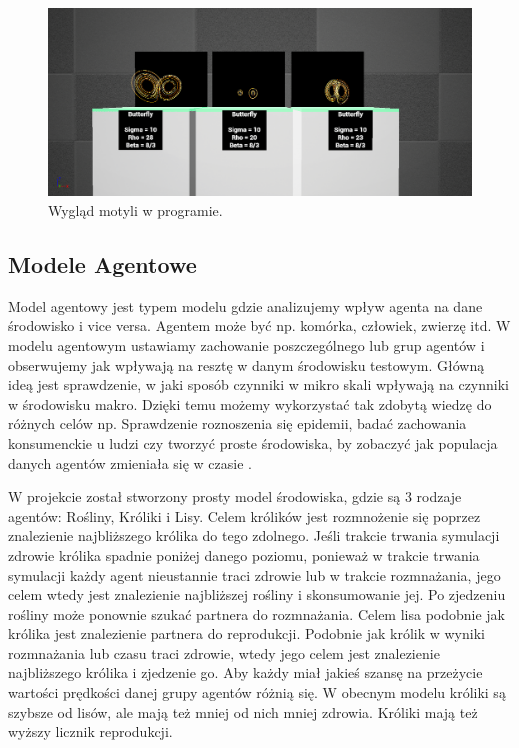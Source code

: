 \documentclass[a4paper,12pt,reqno]{article}
\begin{document}
\begin{figure}[H]%
\centering
\includegraphics[width=0.9\columnwidth]{graphics/butterfly/ButterflyInUE_1.png}
\caption{Wygląd motyli w programie.
\label{ButterflyEffectUE4}}%
%
\qquad
\end{figure}  

\newpage
\subsection{Modele Agentowe}

Model agentowy jest typem modelu gdzie analizujemy wpływ agenta na dane środowisko i vice versa. Agentem może być np. komórka, człowiek, zwierzę itd. W modelu agentowym ustawiamy zachowanie poszczególnego lub grup agentów i obserwujemy jak wpływają na resztę w danym środowisku testowym. Główną ideą jest sprawdzenie, w jaki sposób czynniki w mikro skali wpływają na czynniki w środowisku makro. Dzięki temu możemy wykorzystać tak zdobytą wiedzę do różnych celów np. Sprawdzenie roznoszenia się epidemii, badać zachowania konsumenckie u ludzi czy tworzyć proste środowiska, by zobaczyć jak populacja danych agentów zmieniała się w czasie \cite{agent_examples}.

W projekcie został stworzony prosty model środowiska, gdzie są 3 rodzaje agentów: Rośliny, Króliki i Lisy. Celem królików jest rozmnożenie się poprzez znalezienie najbliższego królika do tego zdolnego. Jeśli trakcie trwania symulacji zdrowie królika spadnie poniżej danego poziomu, ponieważ w trakcie trwania symulacji każdy agent nieustannie traci zdrowie lub w trakcie rozmnażania, jego celem wtedy jest znalezienie najbliższej rośliny i skonsumowanie jej. Po zjedzeniu rośliny może ponownie szukać partnera do rozmnażania.  Celem lisa podobnie jak królika jest znalezienie partnera do reprodukcji. Podobnie jak królik w wyniki rozmnażania lub czasu traci zdrowie, wtedy jego celem jest znalezienie najbliższego królika i zjedzenie go. Aby każdy miał jakieś szansę na przeżycie wartości prędkości danej grupy agentów różnią się. W obecnym modelu króliki są szybsze od lisów, ale mają też mniej od nich mniej zdrowia. Króliki mają też wyższy licznik reprodukcji.
\end{document}
